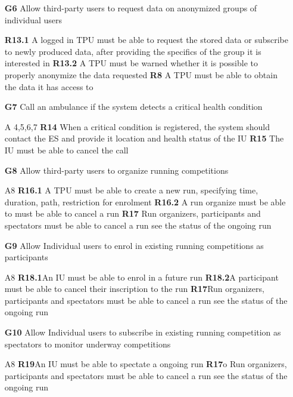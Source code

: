 \begin{itemize}
\item [\textbf{G6}] Allow third-party users to request data on anonymized groups of individual users

\subitem \textbf{R13.1} A logged in TPU must be able to request the stored data or subscribe to newly produced data, after providing the specifics of the group it is interested in
\subitem \textbf{R13.2} A TPU must be warned whether it is possible to properly anonymize the data requested
\subitem \textbf{R8} A TPU must be able to obtain the data it has access to 

\item [\textbf{G7}] Call an ambulance if the system detects a critical health condition

\subitem A 4,5,6,7
\subitem \textbf{R14} When a critical condition is registered, the system should contact the ES and provide it location and health status of the IU
\subitem \textbf{R15} The IU must be able to cancel the call

\item [\textbf{G8}] Allow third-party users to organize running competitions

\subitem A8
\subitem \textbf{R16.1} A TPU must be able to create a new run, specifying time, duration, path, restriction for enrolment
\subitem \textbf{R16.2} A run organize must be able to must be able to cancel a run 
\subitem \textbf{R17} Run organizers, participants and spectators must be able to cancel a run see the status of the ongoing run

\item [\textbf{G9}] Allow Individual users to enrol in existing running competitions as participants

\subitem A8
\subitem \textbf{R18.1}An IU must be able to enrol in a future run
\subitem \textbf{R18.2}A participant must be able to cancel their inscription to the run 
\subitem \textbf{R17}Run organizers, participants and spectators must be able to cancel a run see the status of the ongoing run

\item [\textbf{G10}] Allow Individual users to subscribe in existing running competition as spectators to monitor underway competitions

\subitem A8 
\subitem \textbf{R19}An IU must be able to spectate a ongoing run 
\subitem \textbf{R17}o	Run organizers, participants and spectators must be able to cancel a run see the status of the ongoing run
\end{itemize}
